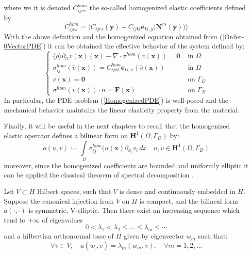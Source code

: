 where we it is denoted $C_{ijrs}^{hom}$ the so-called homogenized elastic coefficients defined by 
\begin{equation*}
    C_{ijrs}^{hom} = \big \langle C_{ijrs}(\mathbf{y}) + C_{ijkl}\mathbf{e}_{kl,y}\big(\mathbf{N}^{rs}(\mathbf{y})\big) \big \rangle 
\end{equation*}
With the above definition and the homogenized equation obtained from (\ref{Order-0VectorPDE}) it can be obtained the effective behavior of the system defined by:
\begin{equation}
    \label{HomogenizedPDE}
    \left \{
    \begin{array}{cc}
        \langle \rho \rangle \partial_{tt} v(\mathbf{x}) (\mathbf{x}) - \nabla \cdot \sigma^{hom} (v(\mathbf{x}) ) = \mathbf{0} & \text{ in } \Omega \\
        \sigma^{hom}_{ij}(\hat{v}(\mathbf{x})) = C^{hom}_{ijkl}\mathbf{e}_{kl,x}(\hat{v}(\mathbf{x})) & \text{ in } \Omega \\
        v(\mathbf{x}) = \mathbf{0} & \text{ on } \Gamma_D \\
        \sigma^{hom}(v(\mathbf{x})) \cdot n = \mathbf{F}(\mathbf{x}) & \text{ on } \Gamma_N
    \end{array}
    \right .
\end{equation}
In particular, the PDE problem (\ref{HomogenizedPDE}) is well-posed and the mechanical behavior maintains the linear elasticity property from the material.

Finally, it will be useful in the next chapters to recall that the homogenized elastic operator defines a bilinear form on $\mathbf{H}^1(\Omega, \Gamma_D)$ by:
\begin{equation*}
    a(u,v) := \int \limits_{\Omega} \sigma^{hom}_{ij}(u(\mathbf{x}) \partial_{x_j} v_i \, dx \quad u,v \in \mathbf{H}^1(\Omega, \Gamma_D)
\end{equation*}
moreover, since the homogenized coefficients are bounded and uniformly elliptic it can be applied the classical theorem of spectral decomposition \cite{raviart1983introduction}.
\begin{prop}
\label{EigenValuesProp}
Let $V \subset H$ Hilbert spaces, such that $V$ is dense and continuously embedded in $H$. Suppose the canonical injection from $V$ on $H$ is compact, and the bilineal form $a(\cdot, \cdot)$ is symmetric, V-elliptic. Then there exist an increasing sequence which tend to $+ \infty$ of eigenvalues
\begin{equation*}
    0 < \lambda_1 < \lambda_2  \leq \dots \leq \lambda_m \leq \cdots 
\end{equation*}
and a hilbertian orthonormal base of $H$ given by eigenvector $w_m$ such that:
\begin{equation*}
    \forall v \in V, \quad a(w_,, v) = \lambda_m (w_m, v), \quad \forall m = 1, 2, \dots
\end{equation*}
\end{prop}




